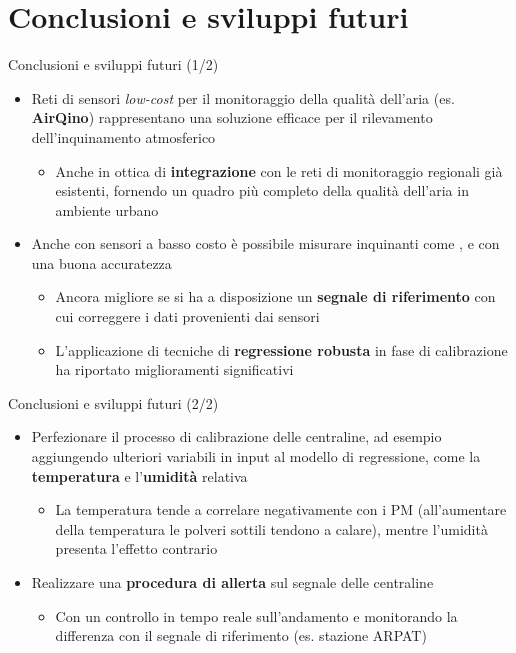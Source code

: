 \section{Conclusioni e sviluppi futuri}
\begin{frame}{Conclusioni e sviluppi futuri (1/2)}
\begin{itemize}
  \item Reti di sensori \textit{low-cost} per il monitoraggio della qualità dell'aria (es. \textbf{AirQino}) rappresentano una soluzione efficace per il rilevamento dell'inquinamento atmosferico\vspace{0.2cm}
  \begin{itemize}
    \item Anche in ottica di \textbf{integrazione} con le reti di monitoraggio regionali già esistenti, fornendo un quadro più completo della qualità dell'aria in ambiente urbano
  \end{itemize}\vspace{0.2cm}
  \item Anche con sensori a basso costo è possibile misurare inquinanti come ,  e  con una buona accuratezza\vspace{0.2cm}
  \begin{itemize}
    \item Ancora migliore se si ha a disposizione un \textbf{segnale di riferimento} con cui correggere i dati provenienti dai sensori\vspace{0.1cm}
    \item L'applicazione di tecniche di \textbf{regressione robusta} in fase di calibrazione ha riportato miglioramenti significativi
  \end{itemize}
\end{itemize}
\end{frame}

\begin{frame}{Conclusioni e sviluppi futuri (2/2)}
\begin{itemize}
  \item Perfezionare il processo di calibrazione delle centraline, ad esempio aggiungendo ulteriori variabili in input al modello di regressione, come la \textbf{temperatura} e l'\textbf{umidità} relativa
  \begin{itemize}
    \item La temperatura tende a correlare negativamente con i PM (all'aumentare della temperatura le polveri sottili tendono a calare), mentre l'umidità presenta l'effetto contrario
  \end{itemize}\vspace{0.2cm}
  \item Realizzare una \textbf{procedura di allerta} sul segnale delle centraline
  \begin{itemize}
    \item Con un controllo in tempo reale sull'andamento e monitorando la differenza con il segnale di riferimento (es. stazione ARPAT)
  \end{itemize}
\end{itemize}
\end{frame}

